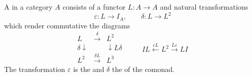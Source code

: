 A  in a category $A$ consists of a functor $L: A \to A$ and natural transformations
$$
\varepsilon: L \to I_A, \qquad \delta: L \to L^2
$$
which render commutative the diagrams
$$
\begin{array}{ccc}
L & \xrightarrow{\delta} & L^2 \\
{\scriptstyle \delta}\downarrow & & \downarrow{\scriptstyle L\delta} \\
L^2 & \xrightarrow{\delta L} & L^3
\end{array}
\qquad
\begin{array}{c}
IL \xleftarrow{\varepsilon L} L^2 \xrightarrow{L\varepsilon} LI
\end{array}
$$
The transformation $\varepsilon$ is the  and $\delta$ the  of the comonad.
